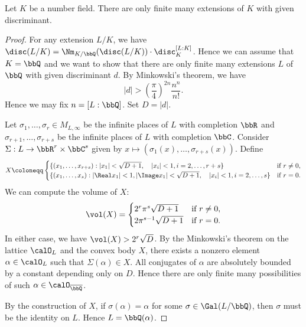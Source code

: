     \begin{theorem}[Hermite]\label{thm:hermite_fix_discriminant}
        Let \(K\) be a number field. 
        There are only finite many extensions of \(K\) with given discriminant.
    \end{theorem}
    \begin{proof}
        For any extension \(L/K\), we have \(\disc(L/K) = \Nm_{K/\bbQ}(\disc(L/K)) \cdot \disc_K^{[L:K]}\).
        Hence we can assume that \(K = \bbQ\) and we want to show that there are only finite many extensions \(L\) of \(\bbQ\) with given discriminant \(d\).
        By Minkowski's theorem, we have 
        \[ |d| > \left(\frac{\pi}{4}\right)^{2n} \frac{n^n}{n!}. \]
        Hence we may fix \(n = [L:\bbQ]\).
        Set \(D = |d|\).

        Let \(\sigma_1, \dots, \sigma_r \in M_{L,\infty}\) be the infinite places of \(L\) with completion \(\bbR\) and 
        \(\sigma_{r+1}, \dots, \sigma_{r+s}\) be the infinite places of \(L\) with completion \(\bbC\).
        Consider \(\Sigma: L \to \bbR^r \times \bbC^s\) given by \(x \mapsto (\sigma_1(x), \dots, \sigma_{r+s}(x))\).
        Define 
        \[ X \coloneqq \begin{cases}
            \{ (x_1, \dots, x_{r+s}) : |x_1| < \sqrt{D+1}, \quad |x_i| < 1, i = 2, \dots, r+s \} & \text{if } r \neq 0, \\
            \{ (x_1, \dots, x_s) : |\Real x_1|<1,|\Image x_1|<\sqrt{D+1},\quad |x_i| < 1, i = 2, \dots, s \} & \text{if } r = 0.
        \end{cases} \]
        We can compute the volume of \(X\):
        \[ \vol(X) = \begin{cases}
            2^r \pi^s \sqrt{D+1} & \text{if } r \neq 0, \\
            2 \pi^{s-1} \sqrt{D+1} & \text{if } r = 0.
        \end{cases} \]
        In either case, we have \(\vol(X) > 2^r \sqrt{D}\).
        By the Minkowski's theorem on the lattice \(\calO_L\) and the convex body \(X\), 
        there exists a nonzero element \(\alpha \in \calO_L\) such that \(\Sigma(\alpha) \in X\).
        All conjugates of \(\alpha\) are absolutely bounded by a constant depending only on \(D\).
        Hence there are only finite many possibilities of such \(\alpha \in \calO_{\overline{\bbQ}}\).

        By the construction of \(X\), if \(\sigma(\alpha) = \alpha\) for some \(\sigma \in \Gal(L/\bbQ)\), 
        then \(\sigma\) must be the identity on \(L\). 
        Hence \(L = \bbQ(\alpha)\).
    \end{proof}

